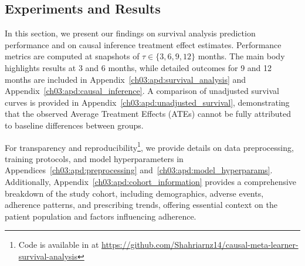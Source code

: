 \subsection{Experiments and Results}
\label{ch03:sec:experiments_results}





In this section, we present our findings on survival analysis prediction performance and on causal inference treatment effect estimates.
Performance metrics are computed at snapshots of \(\tau \in \{3, 6, 9, 12\}\) months.
The main body highlights results at 3 and 6 months, while detailed outcomes for 9 and 12 months are included in Appendix~\ref{ch03:apd:survival_analysis} and Appendix~\ref{ch03:apd:causal_inference}. 
A comparison of unadjusted survival curves is provided in Appendix~\ref{ch03:apd:unadjusted_survival}, demonstrating that the observed Average Treatment Effects (ATEs) cannot be fully attributed to baseline differences between groups.

For transparency and reproducibility\footnote{Code is available in at \url{https://github.com/Shahriarnz14/causal-meta-learner-survival-analysis}}, we provide details on data preprocessing, training protocols, and model hyperparameters in Appendices~\ref{ch03:apd:preprocessing} and~\ref{ch03:apd:model_hyperparams}.
Additionally, Appendix~\ref{ch03:apd:cohort_information} provides a comprehensive breakdown of the study cohort, including demographics, adverse events, adherence patterns, and prescribing trends, offering essential context on the patient population and factors influencing adherence. 

